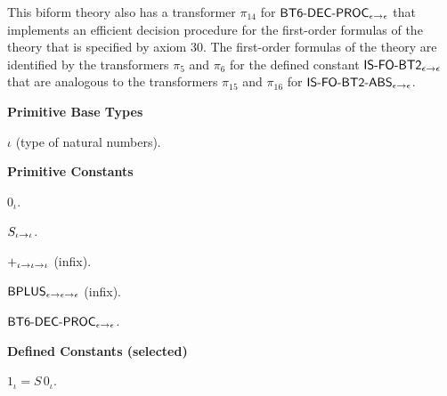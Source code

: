\documentclass[fleqn]{llncs}
\begin{document}
This biform theory also has a transformer $\pi_{14}$ for
$\mbox{\sf BT6-DEC-PROC}_{\epsilon \rightarrow \epsilon}$ that implements an
efficient decision procedure for the first-order formulas of the
theory that is specified by axiom 30.  The first-order formulas of the
theory are identified by the transformers $\pi_{5}$ and $\pi_{6}$ for
the defined constant $\mbox{\sf IS-FO-BT2}_{\epsilon \rightarrow \epsilon}$
that are analogous to the transformers $\pi_{15}$ and $\pi_{16}$ for
$\mbox{\sf IS-FO-BT2-ABS}_{\epsilon \rightarrow \epsilon}$.

\setcounter{biformthy}{5}

\begin{biformthy}\em
\bi

  \item[] 

  \item[] \textbf{Primitive Base Types}

  \be

    \item $\iota$ (type of natural numbers).

  \ee

  \item[] \textbf{Primitive Constants}

  \be

    \item $0_\iota$.

    \item $S_{\iota \rightarrow \iota}$.

    \item $+_{\iota \rightarrow \iota \rightarrow \iota}$ (infix).

    \item $\mbox{\sf BPLUS}_{\epsilon \rightarrow \epsilon \rightarrow \epsilon}$ (infix).

    \setcounter{enumi}{5}

    \iffalse
    \item $\mname{BT5-DEC-PROC}_{\epsilon \tarrow \epsilon}$.
    \fi

    \item $\mbox{\sf BT6-DEC-PROC}_{\epsilon \rightarrow \epsilon}$.

  \ee

  \item[] \textbf{Defined Constants (selected)}

  \be

    \item $1_\iota = S \, 0_\iota$.


\end{biformthy}
\end{document}
